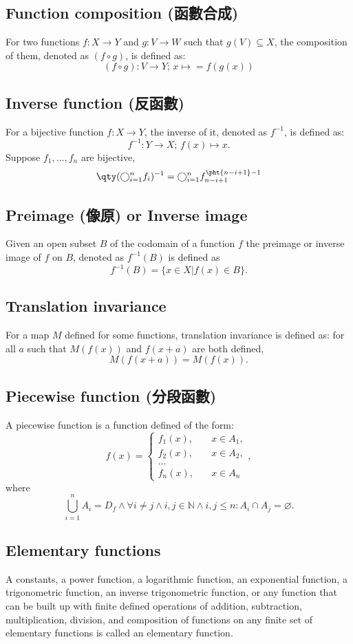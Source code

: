 \subsection{Function composition (函數合成)}
For two functions $f\colon X\to Y$ and $g\colon V\to W$ such that $g(V)\subseteq X$, the composition of them, denoted as $(f\circ g)$, is defined as:
\[(f \circ g)\colon V\to Y;\,x\mapsto = f(g(x))\]
\subsection{Inverse function (反函數)}
For a bijective function $f\colon X\to Y$, the inverse of it, denoted as $f^{-1}$, is defined as:
\[f^{-1}\colon Y\to X;\,f(x)\mapsto x.\]
Suppose $f_1,\ldots,f_n$ are bijective,
\[\qty(\bigcirc_{i=1}^nf_i)^{-1}=\bigcirc_{i=1}^nf_{n-i+1}^{\pht{n-i+1}-1}\]
\subsection{Preimage (像原) or Inverse image}
Given an open subset $B$ of the codomain of a function $f$ the preimage or inverse image of $f$ on $B$, denoted as $f^{-1}(B)$ is defined as
\[f^{-1}(B)=\{x\in X|f(x)\in B\}.\]
\subsection{Translation invariance}
For a map $M$ defined for some functions, translation invariance is defined as: for all $a$ such that $M(f(x))$ and $f(x+a)$ are both defined,
\[M(f(x+a))=M(f(x)).\]
\subsection{Piecewise function (分段函數)}
A piecewise function is a function defined of the form:
\[f(x) =
\begin{cases}
f_1(x), & \quad x\in A_1, \\
f_2(x), & \quad x\in A_2, \\
\dots  \\
f_n(x), & \quad x \in A_n
\end{cases},\]
where
\[\bigcup_{i=1}^nA_i=D_f\land\forall i\neq j\land i,j\in\mathbb{N}\land i,j\leq n\colon A_i\cap A_j=\varnothing.\]
\subsection{Elementary functions}
A constants, a power function, a logarithmic function, an exponential function, a trigonometric function, an inverse trigonometric function, or any function that can be built up with finite defined operations of addition, subtraction, multiplication, division, and composition of functions on any finite set of elementary functions is called an elementary function.

